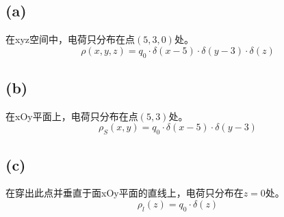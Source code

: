 \documentclass[a4paper]{article}
\begin{document}
		\subsection{(a)}
			在xyz空间中，电荷只分布在点$(5,3,0)$处。
			\begin{equation}
				\rho(x,y,z) = q_0 \cdot \delta(x-5) \cdot \delta(y-3) \cdot \delta(z)
			\end{equation}
		\subsection{(b)}
			在xOy平面上，电荷只分布在点$(5,3)$处。
			\begin{equation}
				\rho_S(x,y) = q_0 \cdot \delta(x-5) \cdot \delta(y-3)
			\end{equation}
		\subsection{(c)}
			在穿出此点并垂直于面xOy平面的直线上，电荷只分布在$z=0$处。
			\begin{equation}
				\rho_l(z) = q_0 \cdot \delta(z)
			\end{equation}
\end{document}

